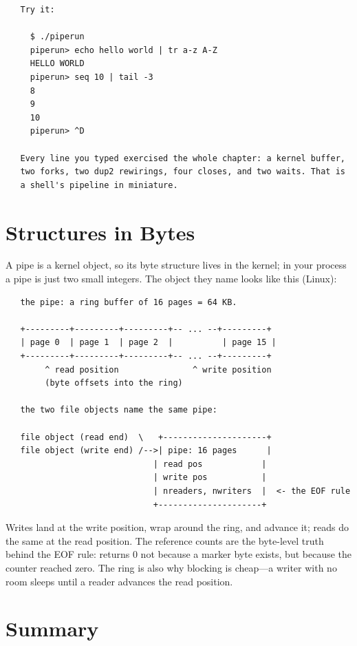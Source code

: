 \begin{verbatim}
   Try it:

     $ ./piperun
     piperun> echo hello world | tr a-z A-Z
     HELLO WORLD
     piperun> seq 10 | tail -3
     8
     9
     10
     piperun> ^D

   Every line you typed exercised the whole chapter: a kernel buffer,
   two forks, two dup2 rewirings, four closes, and two waits. That is
   a shell's pipeline in miniature.
\end{verbatim}

\section{Structures in Bytes}

A pipe is a kernel object, so its byte structure lives in the kernel;
in your process a pipe is just two small integers. The object they
name looks like this (Linux):

\begin{verbatim}
   the pipe: a ring buffer of 16 pages = 64 KB.

   +---------+---------+---------+-- ... --+---------+
   | page 0  | page 1  | page 2  |          | page 15 |
   +---------+---------+---------+-- ... --+---------+
        ^ read position               ^ write position
        (byte offsets into the ring)

   the two file objects name the same pipe:

   file object (read end)  \   +---------------------+
   file object (write end) /-->| pipe: 16 pages      |
                              | read pos            |
                              | write pos           |
                              | nreaders, nwriters  |  <- the EOF rule
                              +---------------------+
\end{verbatim}

Writes land at the write position, wrap around the ring, and advance
it; reads do the same at the read position. The reference counts are
the byte-level truth behind the EOF rule:  returns 0 not
because a marker byte exists, but because the  counter
reached zero. The ring is also why blocking is cheap---a writer with no
room sleeps until a reader advances the read position.

\section{Summary}

